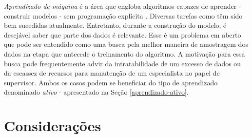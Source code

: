 \textit{Aprendizado de máquina} é a área que engloba algoritmos capazes de
aprender - construir modelos - sem
programação explícita \citep{journals/cacm/Valiant84}.
Diversas tarefas como 
têm sido bem sucedidas atualmente.
Entretanto, durante a construção do modelo, é desejável saber
que parte dos dados é relevante.
Esse é um problema em aberto que pode ser entendido como uma busca
pela melhor maneira de amostragem dos dados
na etapa que antecede o treinamento do algoritmo.
A motivação para essa busca pode frequentemente advir
da intratabilidade de um excesso de dados
ou da escassez de recursos para manutenção de um especialista no
papel de supervisor.
Ambos os casos podem se beneficiar do tipo de
aprendizado denominado \textit{ativo} - apresentado
na Seção \ref{aprendizado-ativo}.

 
 
 
\section{Considerações}
 